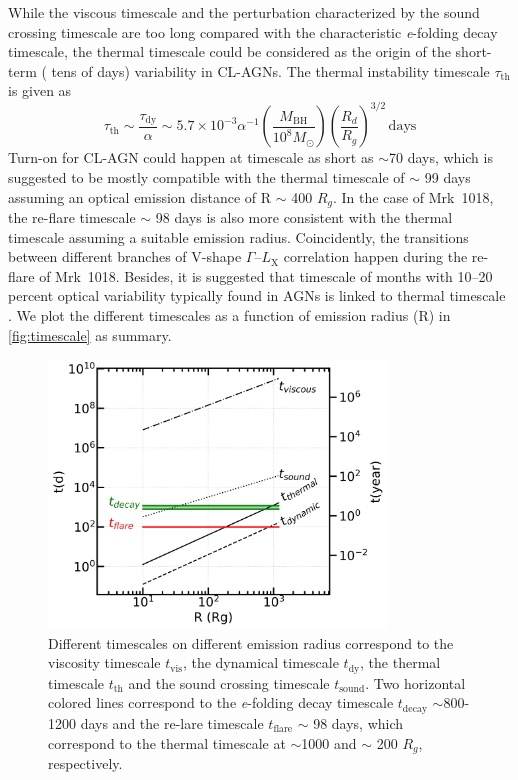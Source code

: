 \documentclass[twocolumn]{aastex63}
\begin{document}
While the viscous timescale and the perturbation characterized by the sound crossing timescale are too long compared with the characteristic \textit{e}-folding decay timescale, the thermal timescale could be considered as the origin of the short-term ( tens of days) variability in CL-AGNs. The thermal instability timescale $\tau_\mathrm{th}$ is given as
\begin{equation}
\tau_\mathrm{th} \sim \frac{\tau_\mathrm{dy}}{\alpha} \sim 5.7\times 10^{-3} \alpha^{-1}(\frac{M_\mathrm{BH}}{10^8M_{\odot}})(\frac{R_d}{R_g})^{3/2} \, \mathrm{days}
\end{equation}
Turn-on for CL-AGN could happen at timescale as short as $\sim$70 days\citep[e.g.][]{2019MNRAS.487.4057K},  which is suggested to be mostly compatible with the thermal timescale of $\sim$ 99 days assuming an optical emission distance of R $\sim$ 400 $R_g$. In the case of Mrk~1018, the re-flare timescale $\sim$ 98 days is also more consistent with the thermal timescale assuming a suitable emission radius. Coincidently, the transitions between different branches of V-shape $\Gamma$--$L_\mathrm{X}$ correlation happen during the re-flare of Mrk~1018. Besides, it is suggested that timescale of months with 10--20 percent optical variability typically found in AGNs is linked to thermal timescale \citep[see also discussion in ][]{2018MNRAS.480.3898N}. We plot the different timescales as a function of emission radius (R) in \autoref{fig:timescale} as summary. 
\begin{figure}
\centering
	\includegraphics[width=0.8\textwidth]{./pic/Mrk1018_timescale_withR.png}
    \caption{Different timescales on different emission radius correspond to the viscosity timescale $t_\mathrm{vis}$, the dynamical timescale $t_\mathrm{dy}$, the thermal timescale $t_\mathrm{th}$ and the sound crossing timescale $t_\mathrm{sound}$. Two horizontal colored lines correspond to the \textit{e}-folding decay timescale $t_\mathrm{decay}$ $\sim$800-1200 days and the re-lare timescale $t_\mathrm{flare}$ $\sim$ 98 days, which correspond to the thermal timescale at $\sim$1000 and $\sim$ 200 $R_g$, respectively.}
    \label{fig:timescale}
\end{figure}
\end{document}

